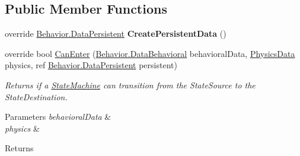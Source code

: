 \subsection*{Public Member Functions}
\begin{DoxyCompactItemize}
\item 
\hypertarget{class_skyrates_1_1_a_i_1_1_state_1_1_transition_1_1_transition_distance_to_target_ac70e27bd4965afe3278f5f7268fa30af}{override \hyperlink{class_skyrates_1_1_a_i_1_1_behavior_1_1_data_persistent}{Behavior.\-Data\-Persistent} {\bfseries Create\-Persistent\-Data} ()}\label{class_skyrates_1_1_a_i_1_1_state_1_1_transition_1_1_transition_distance_to_target_ac70e27bd4965afe3278f5f7268fa30af}

\item 
\hypertarget{class_skyrates_1_1_a_i_1_1_state_1_1_transition_1_1_transition_distance_to_target_a894564a64358ce4924f3b64bfef90662}{override bool \hyperlink{class_skyrates_1_1_a_i_1_1_state_1_1_transition_1_1_transition_distance_to_target_a894564a64358ce4924f3b64bfef90662}{Can\-Enter} (\hyperlink{class_skyrates_1_1_a_i_1_1_behavior_1_1_data_behavioral}{Behavior.\-Data\-Behavioral} behavioral\-Data, \hyperlink{class_skyrates_1_1_physics_1_1_physics_data}{Physics\-Data} physics, ref \hyperlink{class_skyrates_1_1_a_i_1_1_behavior_1_1_data_persistent}{Behavior.\-Data\-Persistent} persistent)}\label{class_skyrates_1_1_a_i_1_1_state_1_1_transition_1_1_transition_distance_to_target_a894564a64358ce4924f3b64bfef90662}

\begin{DoxyCompactList}\small\item\em Returns if a \hyperlink{class_skyrates_1_1_a_i_1_1_state_1_1_state_machine}{State\-Machine} can transition from the State\-Source to the State\-Destination. 


\begin{DoxyParams}{Parameters}
{\em behavioral\-Data} & \\
\hline
{\em physics} & \\
\hline
\end{DoxyParams}
\begin{DoxyReturn}{Returns}

\end{DoxyReturn}
 \end{DoxyCompactList}\end{DoxyCompactItemize}

